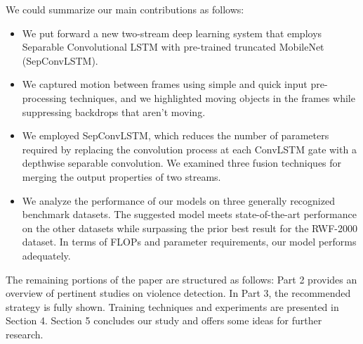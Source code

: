 \documentclass{article}
\begin{document}
We could summarize our main contributions as follows: 
\begin{itemize}[label=$\star$]
\item We put forward a new two-stream deep learning system that employs Separable Convolutional LSTM with pre-trained truncated MobileNet (SepConvLSTM).
\item We captured motion between frames using simple and quick input pre-processing techniques, and we highlighted moving objects in the frames while suppressing backdrops that aren't moving.
\item We employed SepConvLSTM, which reduces the number of parameters required by replacing the convolution process at each ConvLSTM gate with a depthwise separable convolution. We examined three fusion techniques for merging the output properties of two streams.
\item We analyze the performance of our models on three generally recognized benchmark datasets. The suggested model meets state-of-the-art performance on the other datasets while surpassing the prior best result for the RWF-2000 dataset. In terms of FLOPs and parameter requirements, our model performs adequately.
\end{itemize}
The remaining portions of the paper are structured as follows: Part 2 provides an overview of pertinent studies on violence detection. In Part 3, the recommended strategy is fully shown. Training techniques and experiments are presented in Section 4. Section 5 concludes our study and offers some ideas for further research.
\end{document}
